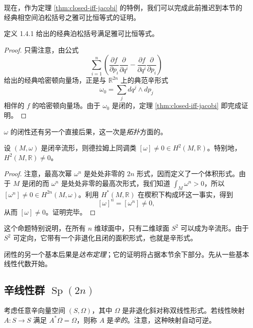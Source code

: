 现在，作为定理 \ref{thm:closed-iff-jacobi} 的特例，我们可以完成此前推迟到本节的经典相空间泊松括号之雅可比恒等式的证明。

\begin{corollary}
\label{cor:classical-poisson-jacobi}
定义 1.4.1 给出的经典泊松括号满足雅可比恒等式。
\end{corollary}

\begin{proof}
只需注意，由公式
\[
  \sum_{i=1}^n
  \left(
    \frac{\partial f}{\partial p_i}\frac{\partial}{\partial q^i}
    -\frac{\partial f}{\partial q^i}\frac{\partial}{\partial p_i}
  \right)
\]
给出的经典哈密顿向量场，正是与 $\mathbb R^{2n}$ 上的典范辛形式
\[
  \omega_0=\sum_jdq^j\wedge dp_j
\]
相伴的 $f$ 的哈密顿向量场。由于 $\omega_0$ 是闭的，定理 \ref{thm:closed-iff-jacobi} 即完成证明。
\end{proof}

$\omega$ 的闭性还有另一个直接后果，这一次是\emph{拓扑}方面的。

\begin{proposition}
\label{prop:closed-symplectic-nonzero-class}
设 $(M,\omega)$ 是闭辛流形，则德拉姆上同调类 $[\omega]\ne0\in H^2(M,\mathbb R)$。特别地，$H^2(M,\mathbb R)\ne0$。
\end{proposition}

\begin{proof}
注意，最高次幂 $\omega^n$ 是处处非零的 $2n$ 形式，因而定义了一个体积形式。由于 $M$ 是闭的而 $\omega^n$ 是处处非零的最高次形式，我们知道
$\int_M\omega^n>0$，所以 $[\omega^n]\ne0\in H^{2n}(M,\omega)$。利用 $H^*(M,\mathbb R)$ 在楔积下构成环这一事实，得到
\[
  [\omega]^n=[\omega^n]\ne0,
\]
从而 $[\omega]\ne0$。证明完毕。
\end{proof}

这个命题特别说明，在所有 $n$ 维球面中，只有二维球面 $S^2$ 可以成为辛流形。由于 $S^2$ 可定向，它带有一个非退化且闭的面积形式，也就是辛形式。

闭性的另一个基本后果是\emph{达布定理}；它的证明将占据本节余下部分。先从一些基本线性代数开始。

\subsection{\texorpdfstring{辛线性群 $\operatorname{Sp}(2n)$}{辛线性群 Sp(2n)}}

考虑任意辛向量空间 $(S,\Omega)$，其中 $\Omega$ 是非退化斜对称双线性形式。若线性映射 $A:S\to S$ 满足 $A^*\Omega=\Omega$，则称 $A$ 是\emph{辛的}。注意，这种映射自动可逆。

